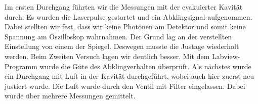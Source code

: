 Im ersten Durchgang führten wir die Messungen mit der evakuierter Kavität durch. Es wurden die Laserpulse gestartet und ein Abklingsignal aufgenommen. Dabei stellten wir fest, dass wir keine Photonen am Detektor und somit keine Spannung am Oszilloskop wahrnahmen. Der Grund lag an der verstellten Einstellung von einem der Spiegel. Deswegen musste die Justage wiederholt werden. Beim Zweiten Versuch lagen wir deutlich besser. Mit dem Labview-Programm wurde die Güte des Abklingverhalten überprüft. 
Als nächstes wurde ein Durchgang mit Luft in der Kavität durchgeführt, wobei auch hier zuerst neu justiert wurde. Die Luft wurde durch den Ventil mit Filter eingelassen. Dabei wurde über mehrere Messungen gemittelt.


